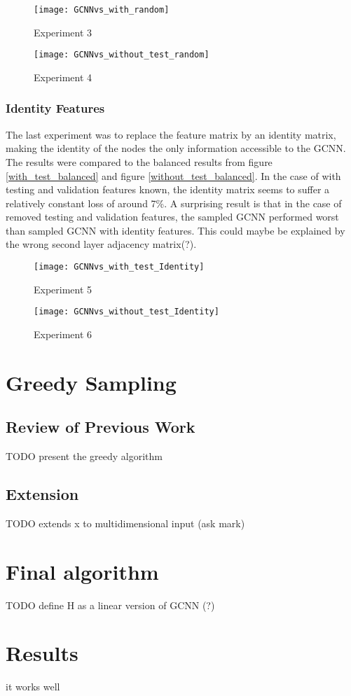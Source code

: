 \documentclass{article}
\begin{document}
\begin{figure}[h]
\centering
\texttt{[image: GCNNvs\_with\_random]}
\caption{
Experiment 3
}
\label{with_test_unbalanced}
\end{figure}

\begin{figure}[h]
\centering
\texttt{[image: GCNNvs\_without\_test\_random]}
\caption{
Experiment 4
}
\label{without_test_unbalanced}
\end{figure}

\subsubsection*{Identity Features}
The last experiment was to replace the feature matrix by an identity matrix, making the identity of the nodes the only information accessible to the GCNN. The results were compared to the balanced results from figure \ref{with_test_balanced} and figure \ref{without_test_balanced}. In the case %
of with testing and validation features known, the identity matrix seems %
 to suffer a relatively constant loss of around 7\%. A surprising result is that in the case of removed testing and validation features, the sampled GCNN performed worst than sampled GCNN with identity features. %
  This could maybe %
 be explained by the wrong second layer adjacency matrix(?).

\begin{figure}[h]
\centering
\texttt{[image: GCNNvs\_with\_test\_Identity]}
\caption{
Experiment 5
}
\label{with_test_balanced_Iden}
\end{figure}

\begin{figure}[h]
\centering
\texttt{[image: GCNNvs\_without\_test\_Identity]}
\caption{
Experiment 6
}
\label{without_test_balanced_Iden}
\end{figure}



\section*{Greedy Sampling}
\subsection*{Review of Previous Work}

TODO present the greedy algorithm

\subsection*{Extension}
TODO extends x to multidimensional input (ask mark)
\section*{Final algorithm}
TODO define H as a linear version of GCNN (?)
\section*{Results}
it works well
{}
\end{document}
